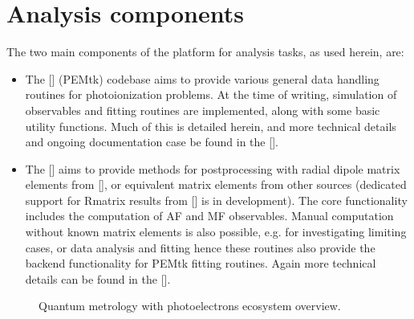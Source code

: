 \documentclass[letterpaper,10pt,english]{jupyterBook}
\begin{document}
\section{Analysis components}
\label{\detokenize{part1/platform_intro_071122:analysis-components}}\label{\detokenize{part1/platform_intro_071122:sect-platform-analysis}}
\sphinxAtStartPar
The two main components of the platform for analysis tasks, as used herein, are:
\begin{itemize}
\item {} 
\sphinxAtStartPar
The  {[}{]} (PEMtk) codebase aims to provide various general data handling routines for photoionization problems. At the time of writing, simulation of observables and fitting routines are implemented, along with some basic utility functions.
Much of this is detailed herein, and more technical details and ongoing documentation case be found in the  {[}{]}.

\item {} 
\sphinxAtStartPar
The  {[}{]} aims to provide methods for post\sphinxhyphen{}processing with  radial dipole matrix
elements from  {[}{]}, or equivalent matrix elements from other sources (dedicated support for R\sphinxhyphen{}matrix results from  {[}{]} is in development).
The core functionality includes the computation of AF and MF observables. Manual computation without known matrix elements is also possible, e.g. for investigating
limiting cases, or data analysis and fitting \sphinxhyphen{} hence these routines also provide the backend functionality for PEMtk fitting routines. Again more technical details can be found in the  {[}{]}.

\end{itemize}

\begin{figure}[htbp]
\centering
\capstart

\noindent{}
\caption{Quantum metrology with photoelectrons ecosystem overview.}\label{\detokenize{part1/platform_intro_071122:qm-platform-diag}}\end{figure}
\end{document}
